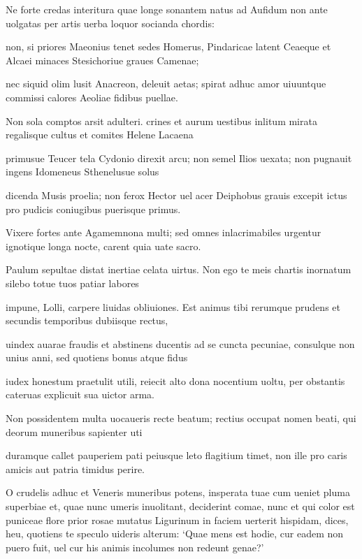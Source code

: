 \documentclass{book}
\newenvironment {carmen} [1] [\relax] 
  {\Titulus \Versus \incipit*\numerus{1}#1}
  {\endVersus}
\newcommand {\Alcaic}    {\Forma \strophae {0 \poena 01 \poena 2}}
\begin{document}
\begin{carmen}[\Alcaic]


Ne forte credas interitura quae
 longe sonantem natus ad Aufidum
      non ante uolgatas per artis
      uerba loquor socianda chordis:
 
non, si priores Maeonius tenet               
 sedes Homerus, Pindaricae latent
      Ceaeque et Alcaei minaces
      Stesichoriue graues Camenae;
 
nec siquid olim lusit Anacreon,
 deleuit aetas; spirat adhuc amor               
      uiuuntque commissi calores
      Aeoliae fidibus puellae.
 
Non sola comptos arsit adulteri.
 crines et aurum uestibus inlitum
      mirata regalisque cultus               
      et comites Helene Lacaena
 
primusue Teucer tela Cydonio
 direxit arcu; non semel Ilios
      uexata; non pugnauit ingens
      Idomeneus Sthenelusue solus               
 
dicenda Musis proelia; non ferox
 Hector uel acer Deiphobus grauis
      excepit ictus pro pudicis
      coniugibus puerisque primus.
 
Vixere fortes ante Agamemnona               
 multi; sed omnes inlacrimabiles
      urgentur ignotique longa
      nocte, carent quia uate sacro.
 
Paulum sepultae distat inertiae
 celata uirtus. Non ego te meis               
      chartis inornatum silebo
      totue tuos patiar labores
 
impune, Lolli, carpere liuidas
 obliuiones. Est animus tibi
      rerumque prudens et secundis               
      temporibus dubiisque rectus,
 
uindex auarae fraudis et abstinens
 ducentis ad se cuncta pecuniae,
      consulque non unius anni,
      sed quotiens bonus atque fidus               
 
iudex honestum praetulit utili,
 reiecit alto dona nocentium
      uoltu, per obstantis cateruas
      explicuit sua uictor arma.
 
Non possidentem multa uocaueris               
 recte beatum; rectius occupat
      nomen beati, qui deorum
      muneribus sapienter uti
 
duramque callet pauperiem pati
 peiusque leto flagitium timet,               
      non ille pro caris amicis
      aut patria timidus perire.
 

\end{carmen}

\begin{carmen}


O crudelis adhuc et Veneris muneribus potens,
 insperata tuae cum ueniet pluma superbiae
 et, quae nunc umeris inuolitant, deciderint comae,
 nunc et qui color est puniceae flore prior rosae
 mutatus Ligurinum in faciem uerterit hispidam,               
 dices, heu, quotiens te speculo uideris alterum:
 `Quae mens est hodie, cur eadem non puero fuit,
 uel cur his animis incolumes non redeunt genae?'
 

\end{carmen}
\end{document}
